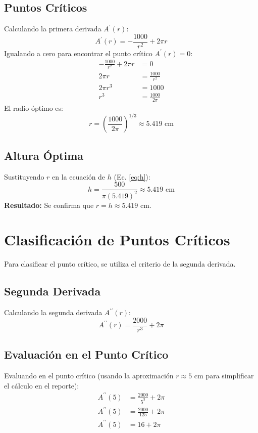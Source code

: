 \documentclass[12pt]{article}  %
\begin{document}
\subsection{Puntos Críticos}
Calculando la primera derivada $A^{\prime}(r)$:
\begin{equation}
 A^{\prime}(r) = -\frac{1000}{r^{2}} + 2\pi r
\end{equation}
Igualando a cero para encontrar el punto crítico $A^{\prime}(r)=0$:
\begin{align*}
 -\frac{1000}{r^{2}} + 2\pi r &= 0 \\
 2\pi r &= \frac{1000}{r^{2}} \\
 2\pi r^{3} &= 1000 \\
 r^{3} &= \frac{1000}{2\pi}
\end{align*}
El radio óptimo es:
\begin{equation}
 r = \left(\frac{1000}{2\pi}\right)^{1/3} \approx 5.419\text{ cm}
\end{equation}

\subsection{Altura Óptima}
Sustituyendo $r$ en la ecuación de $h$ (Ec. \ref{eq:h}):
\begin{equation}
 h = \frac{500}{\pi (5.419)^{2}} \approx 5.419\text{ cm}
\end{equation}
\textbf{Resultado:} Se confirma que $r=h \approx 5.419\text{ cm}$.

\section{Clasificación de Puntos Críticos}

Para clasificar el punto crítico, se utiliza el criterio de la segunda derivada.

\subsection{Segunda Derivada}
Calculando la segunda derivada $A^{\prime\prime}(r)$:
\begin{equation}
 A^{\prime\prime}(r) = \frac{2000}{r^{3}} + 2\pi
\end{equation}

\subsection{Evaluación en el Punto Crítico}
Evaluando en el punto crítico (usando la aproximación $r \approx 5\text{ cm}$ para simplificar el cálculo en el reporte):
\begin{align*}
 A^{\prime\prime}(5) &= \frac{2000}{5^{3}} + 2\pi \\
 A^{\prime\prime}(5) &= \frac{2000}{125} + 2\pi \\
 A^{\prime\prime}(5) &= 16 + 2\pi
\end{align*}
\end{document}
